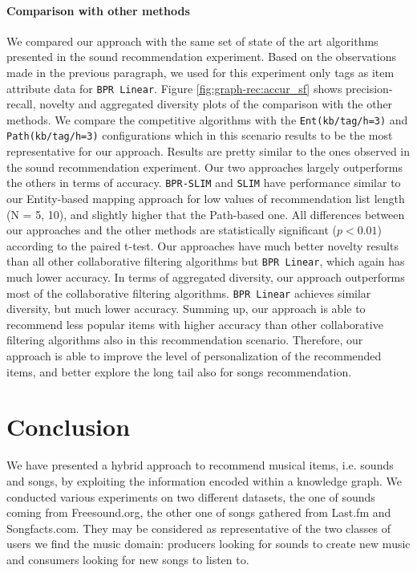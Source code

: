 \paragraph*{\textbf{Comparison with other methods}}\label{comp}
We compared our approach with the same set of state of the art algorithms presented in the sound recommendation experiment. Based on the observations made in the previous paragraph, we used for this experiment only tags as item attribute data for \texttt{BPR Linear}.
Figure \ref{fig:graph-rec:accur_sf} shows precision-recall, novelty and aggregated diversity plots of the comparison with the other methods. We compare the competitive algorithms with the \texttt{Ent(kb/tag/h=3)} and \texttt{Path(kb/tag/h=3)} configurations which in this scenario results to be the most representative for our approach. 
Results are pretty similar to the ones observed in the sound recommendation experiment. Our two approaches largely outperforms the others in terms of accuracy. \texttt{BPR-SLIM} and \texttt{SLIM} have performance similar to our Entity-based mapping approach for low values of recommendation list length (N = 5, 10), and slightly higher that the Path-based one. All differences between our approaches and the other methods are statistically significant ($p<0.01$) according to the paired t-test. Our approaches have much better novelty results than all other collaborative filtering algorithms but \texttt{BPR Linear}, which again has much lower accuracy. In terms of aggregated diversity, our approach outperforms most of the collaborative filtering algorithms. \texttt{BPR Linear} achieves similar diversity, but much lower accuracy.
Summing up, our approach is able to recommend less popular items with higher accuracy than other collaborative filtering algorithms also in this recommendation scenario. Therefore, our approach is able to improve the level of personalization of the recommended items, and  better explore the long tail also for songs recommendation.



\section{Conclusion}
\label{sec:graph-rec:conclusion}
We have presented a hybrid approach to recommend musical items, i.e. sounds and songs, by exploiting the information encoded within a knowledge graph. We conducted various experiments on two different datasets, the one of sounds coming from Freesound.org, the other one of songs gathered from Last.fm and Songfacts.com. They may be considered as representative of the two classes of users we find the music domain: producers looking for sounds to create new music and consumers looking for new songs to listen to.

